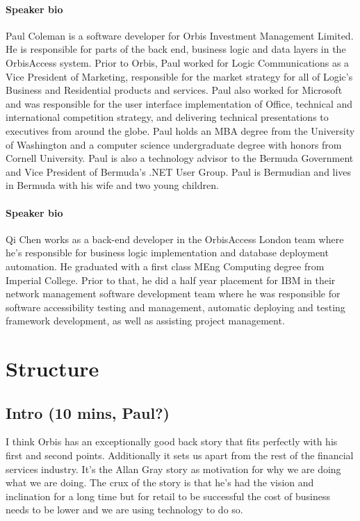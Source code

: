 \documentclass{article}
\begin{document}
\paragraph{Speaker bio}
Paul Coleman is a software developer for Orbis Investment Management
Limited.  He is responsible for parts of the back end, business logic
and data layers in the OrbisAccess system.
%
Prior to Orbis, Paul worked for Logic Communications as a Vice President
of Marketing, responsible for the market strategy for all of Logic's
Business and Residential products and services.
%
Paul also worked for Microsoft and was responsible for the user
interface implementation of Office, technical and international
competition strategy, and delivering technical presentations to
executives from around the globe.
%
Paul holds an MBA degree from the University of Washington and a
computer science undergraduate degree with honors from Cornell
University.  Paul is also a technology advisor to the Bermuda
Government and Vice President of Bermuda's .NET User Group.
%
Paul is Bermudian and lives in Bermuda with his wife and two young children.

\paragraph{Speaker bio} 
Qi Chen works as a back-end developer in the OrbisAccess London team
where he's responsible for business logic implementation and database
deployment automation.
%
He graduated with a first class MEng Computing degree from Imperial
College.
%
Prior to that, he did a half year placement for IBM in their network
management software development team where he was responsible for
software accessibility testing and management, automatic deploying and
testing framework development, as well as assisting project
management.

\tableofcontents

\section{Structure}
\subsection{Intro (10 mins, Paul?)}
I think Orbis has an exceptionally good back story that fits perfectly with his first and second points.  Additionally it sets us apart from the rest of the financial services industry.  It's the Allan Gray story as motivation for why we are doing what we are doing.  The crux of the story is that he's had the vision and inclination for a long time but for retail to be successful the cost of business needs to be lower and we are using technology to do so.
\end{document}
